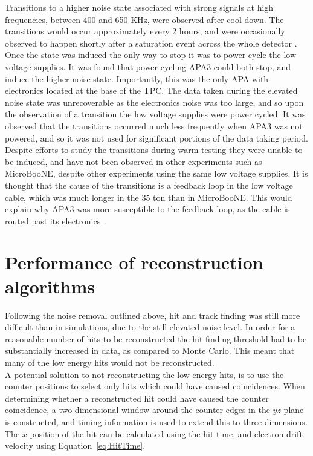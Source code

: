 Transitions to a higher noise state associated with strong signals at high frequencies, between 400 and 650 KHz, were observed after cool down. The transitions would occur approximately every 2 hours, and were occasionally observed to happen shortly after a saturation event across the whole detector \citep{35tonNoiseMeeting}. Once the state was induced the only way to stop it was to power cycle the low voltage supplies. It was found that power cycling APA3 could both stop, and induce the higher noise state. Importantly, this was the only APA with electronics located at the base of the TPC. The data taken during the elevated noise state was unrecoverable as the electronics noise was too large, and so upon the observation of a transition the low voltage supplies were power cycled. It was observed that the transitions occurred much less frequently when APA3 was not powered, and so it was not used for significant portions of the data taking period. Despite efforts to study the transitions during warm testing they were unable to be induced, and have not been observed in other experiments such as MicroBooNE, despite other experiments using the same low voltage supplies. It is thought that the cause of the transitions is a feedback loop in the low voltage cable, which was much longer in the 35 ton than in MicroBooNE. This would explain why APA3 was more susceptible to the feedback loop, as the cable is routed past its electronics~\citep{35tonNoiseDoc}.

\section{Performance of reconstruction algorithms} \label{sec:DataAlgs}  %
Following the noise removal outlined above, hit and track finding was still more difficult than in simulations, due to the still elevated noise level. In order for a reasonable number of hits to be reconstructed the hit finding threshold had to be substantially increased in data, as compared to Monte Carlo. This meant that many of the low energy hits would not be reconstructed. \\

A potential solution to not reconstructing the low energy hits, is to use the counter positions to select only hits which could have caused coincidences. When determining whether a reconstructed hit could have caused the counter coincidence, a two-dimensional window around the counter edges in the $yz$ plane is constructed, and timing information is used to extend this to three dimensions. The $x$ position of the hit can be calculated using the hit time, and electron drift velocity using Equation~\ref{eq:HitTime}. \\


